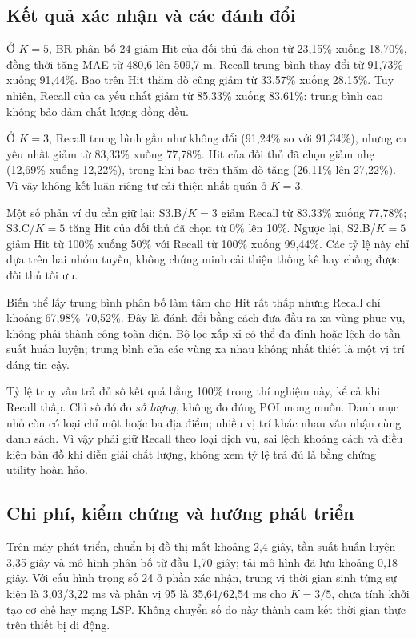 \subsection{Kết quả xác nhận và các đánh đổi}

Ở $K=5$, BR-phân bố 24 giảm Hit của đối thủ đã chọn từ 23,15\% xuống 18,70\%, đồng thời tăng MAE từ 480,6 lên 509,7 m. Recall trung bình thay đổi từ 91,73\% xuống 91,44\%. Bao trên Hit thăm dò cũng giảm từ 33,57\% xuống 28,15\%. Tuy nhiên, Recall của ca yếu nhất giảm từ 85,33\% xuống 83,61\%: trung bình cao không bảo đảm chất lượng đồng đều.

Ở $K=3$, Recall trung bình gần như không đổi (91,24\% so với 91,34\%), nhưng ca yếu nhất giảm từ 83,33\% xuống 77,78\%. Hit của đối thủ đã chọn giảm nhẹ (12,69\% xuống 12,22\%), trong khi bao trên thăm dò tăng (26,11\% lên 27,22\%). Vì vậy không kết luận riêng tư cải thiện nhất quán ở $K=3$.



Một số phản ví dụ cần giữ lại: S3.B/$K=3$ giảm Recall từ 83,33\% xuống 77,78\%; S3.C/$K=5$ tăng Hit của đối thủ đã chọn từ 0\% lên 10\%. Ngược lại, S2.B/$K=5$ giảm Hit từ 100\% xuống 50\% với Recall từ 100\% xuống 99,44\%. Các tỷ lệ này chỉ dựa trên hai nhóm tuyến, không chứng minh cải thiện thống kê hay chống được đối thủ tối ưu.

Biến thể lấy trung bình phân bố làm tâm cho Hit rất thấp nhưng Recall chỉ khoảng 67,98\%--70,52\%. Đây là đánh đổi bằng cách đưa đầu ra xa vùng phục vụ, không phải thành công toàn diện. Bộ lọc xấp xỉ có thể đa đỉnh hoặc lệch do tần suất huấn luyện; trung bình của các vùng xa nhau không nhất thiết là một vị trí đáng tin cậy.

Tỷ lệ truy vấn trả đủ số kết quả bằng 100\% trong thí nghiệm này, kể cả khi Recall thấp. Chỉ số đó đo \emph{số lượng}, không đo đúng POI mong muốn. Danh mục nhỏ còn có loại chỉ một hoặc ba địa điểm; nhiều vị trí khác nhau vẫn nhận cùng danh sách. Vì vậy phải giữ Recall theo loại dịch vụ, sai lệch khoảng cách và điều kiện bản đồ khi diễn giải chất lượng, không xem tỷ lệ trả đủ là bằng chứng utility hoàn hảo.

\subsection{Chi phí, kiểm chứng và hướng phát triển}

Trên máy phát triển, chuẩn bị đồ thị mất khoảng 2,4 giây, tần suất huấn luyện 3,35 giây và mô hình phân bố từ đầu 1,70 giây; tải mô hình đã lưu khoảng 0,18 giây. Với cấu hình trọng số 24 ở phần xác nhận, trung vị thời gian sinh từng sự kiện là 3,03/3,22 ms và phân vị 95 là 35,64/62,54 ms cho $K=3/5$, chưa tính khởi tạo cơ chế hay mạng LSP. Không chuyển số đo này thành cam kết thời gian thực trên thiết bị di động.

